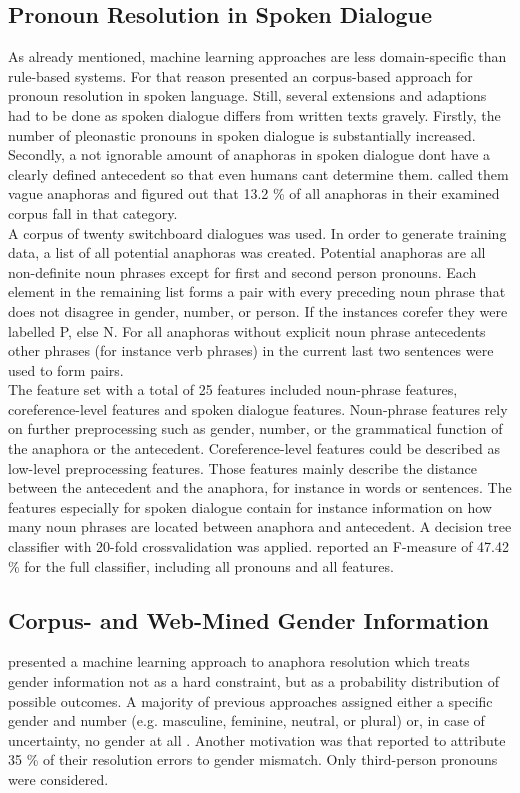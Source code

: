 \subsection{Pronoun Resolution in Spoken Dialogue}
As already mentioned, machine learning approaches are less domain-specific than rule-based systems. For that reason \citep{strube2003machine} presented an corpus-based approach for pronoun resolution in spoken language. Still, several extensions and adaptions had to be done as spoken dialogue differs from written texts gravely. Firstly, the number of pleonastic pronouns in spoken dialogue is substantially increased. Secondly, a not ignorable amount of anaphoras in spoken dialogue dont have a clearly defined antecedent so that even humans cant determine them. \citep{eckert2000dialogue} called them vague anaphoras and figured out that 13.2 \% of all anaphoras in their examined corpus fall in that category.\\
A corpus of twenty switchboard dialogues was used. In order to generate training data, a list of all potential anaphoras was created. Potential anaphoras are all non-definite noun phrases except for first and second person pronouns. Each element in the remaining list forms a pair with every preceding noun phrase that does not disagree in gender, number, or person. If the instances corefer they were labelled P, else N. For all anaphoras without explicit noun phrase antecedents other phrases (for instance verb phrases) in the current last two sentences were used to form pairs. \\
The feature set with a total of 25 features included noun-phrase features, coreference-level features and spoken dialogue features. Noun-phrase features rely on further preprocessing such as gender, number, or the grammatical function of the anaphora or the antecedent. Coreference-level features could be described as low-level preprocessing features. Those features mainly describe the distance between the antecedent and the anaphora, for instance in words or sentences. The features especially for spoken dialogue contain for instance information on how many noun phrases are located between anaphora and antecedent.
A decision tree classifier with 20-fold crossvalidation was applied. \citep{strube2003machine} reported an F-measure of 47.42 \% for the full classifier, including all pronouns and all features. 


\subsection{Corpus- and Web-Mined Gender Information}
\label{section:bergsma2005automatic}
\cite{bergsma2005automatic} presented a machine learning approach to anaphora resolution which treats gender information not as a hard constraint, but as a probability distribution of possible outcomes. A majority of previous approaches assigned either a specific gender and number (e.g. masculine, feminine, neutral, or plural) or, in case of uncertainty, no gender at all \citep{soon2001machine, broscheit2010bart}. Another motivation was that \cite{kennedy1996anaphora} reported to attribute 35 \% of their resolution errors to gender mismatch. Only third-person pronouns were considered.

